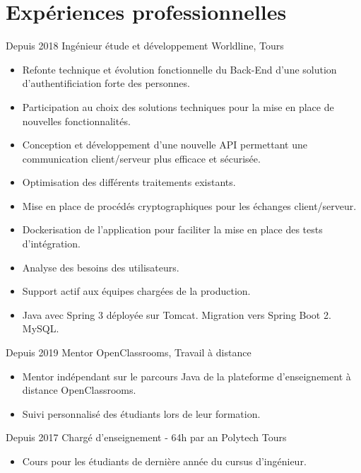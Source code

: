\documentclass[]{friggeri-cv}
\begin{document}
\section{Expériences professionnelles}
\vspace{-5pt}
\begin{entrylist}
  \entry
    {Depuis 2018}
    {Ingénieur étude et développement}
    {Worldline, Tours}
    {
    \vspace{-0.8\baselineskip}
	\begin{itemize}[leftmargin=*]
		\item Refonte technique et évolution fonctionnelle du Back-End d'une solution d'authentificiation forte des personnes.
		\item Participation au choix des solutions techniques pour la mise en place de nouvelles fonctionnalités.
		\item Conception et développement d'une nouvelle API permettant une communication client/serveur plus efficace et sécurisée.
		\item Optimisation des différents traitements existants.
		\item Mise en place de procédés cryptographiques pour les échanges client/serveur.
		\item Dockerisation de l'application pour faciliter la mise en place des tests d'intégration.
		\item Analyse des besoins des utilisateurs.
		\item Support actif aux équipes chargées de la production.
		\item Java avec Spring 3 déployée sur Tomcat. Migration vers Spring Boot 2. MySQL.
	\end{itemize}
	}
      \entry
    {Depuis 2019}
    {Mentor}
    {OpenClassrooms, Travail à distance}
    {
    \vspace{-0.8\baselineskip}
	\begin{itemize}[leftmargin=*]
		\item Mentor indépendant sur le parcours Java de la plateforme d'enseignement à distance OpenClassrooms.
		\item  Suivi personnalisé des étudiants lors de leur formation. 
	\end{itemize}
	}
  \entry
    {Depuis 2017}
    {Chargé d'enseignement - 64h par an}
    {Polytech Tours}
    {
    \vspace{-0.8\baselineskip}
	\begin{itemize}[leftmargin=*]
		\item Cours pour les étudiants de dernière année du cursus d'ingénieur.

\end{itemize}}
\end{entrylist}
\end{document}
